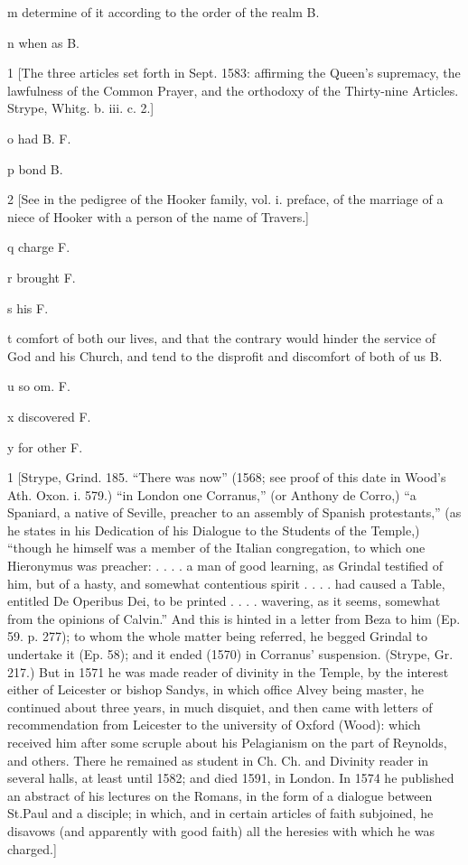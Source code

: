 m
determine of it according to the order of the realm B.

n
when as B.

1
[The three articles set forth in Sept. 1583: affirming the Queen’s supremacy, the lawfulness of the Common Prayer, and the orthodoxy of the Thirty-nine Articles. Strype, Whitg. b. iii. c. 2.]

o
had B. F.

p
bond B.

2
[See in the pedigree of the Hooker family, vol. i. preface, of the marriage of a niece of Hooker with a person of the name of Travers.]

q
charge F.

r
brought F.

s
his F.

t
comfort of both our lives, and that the contrary would hinder the service of God and his Church, and tend to the disprofit and discomfort of both of us B.

u
so om. F.

x
discovered F.

y
for other F.

1
[Strype, Grind. 185. “There was now” (1568; see proof of this date in Wood’s Ath. Oxon. i. 579.) “in London one Corranus,” (or Anthony de Corro,) “a Spaniard, a native of Seville, preacher to an assembly of Spanish protestants,” (as he states in his Dedication of his Dialogue to the Students of the Temple,) “though he himself was a member of the Italian congregation, to which one Hieronymus was preacher: . . . . a man of good learning, as Grindal testified of him, but of a hasty, and somewhat contentious spirit . . . . had caused a Table, entitled De Operibus Dei, to be printed . . . . wavering, as it seems, somewhat from the opinions of Calvin.” And this is hinted in a letter from Beza to him (Ep. 59. p. 277); to whom the whole matter being referred, he begged Grindal to undertake it (Ep. 58); and it ended (1570) in Corranus’ suspension. (Strype, Gr. 217.) But in 1571 he was made reader of divinity in the Temple, by the interest either of Leicester or bishop Sandys, in which office Alvey being master, he continued about three years, in much disquiet, and then came with letters of recommendation from Leicester to the university of Oxford (Wood): which received him after some scruple about his Pelagianism on the part of Reynolds, and others. There he remained as student in Ch. Ch. and Divinity reader in several halls, at least until 1582; and died 1591, in London. In 1574 he published an abstract of his lectures on the Romans, in the form of a dialogue between St.Paul and a disciple; in which, and in certain articles of faith subjoined, he disavows (and apparently with good faith) all the heresies with which he was charged.]

